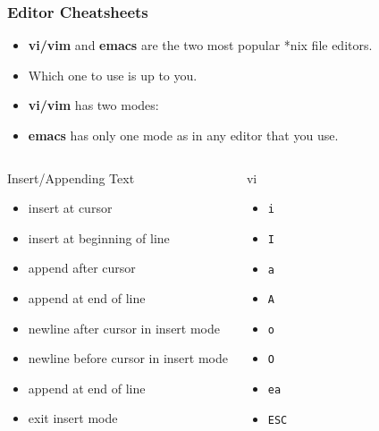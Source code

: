 \documentclass[c,compress,xcolor=svgnames]{beamer}
\newenvironment{eblock}[0]
{
\begin{beamerboxesrounded}[upper=uppercol2,lower=lowercol2,shadow=true]}
{\end{beamerboxesrounded}}
\begin{document}
\begin{frame}[allowframebreaks]
  \frametitle{\small Editor Cheatsheets}
  \begin{itemize}
    \item \textbf{\color{dkgreen}vi/vim} and \textbf{\color{dkgreen}emacs} are the two most popular *nix file editors.
    \item Which one to use is up to you.
    \item \textbf{\color{dkgreen}vi/vim} has two modes:
    \item \textbf{\color{dkgreen}emacs} has only one mode as in any editor that you use.
  \end{itemize}
  {\scriptsize
  \begin{columns}[t]
    \begin{eblock}{Insert/Appending Text}
    \begin{itemize}
      \item insert at cursor 
      \item insert at beginning of line
      \item append after cursor
      \item append at end of line
      \item newline after cursor in insert mode
      \item newline before cursor in insert mode
      \item append at end of line
      \item exit insert mode
    \end{itemize}
    \end{eblock}
    \begin{eblock}{vi}
    \begin{itemize}
      \item \texttt{i}
      \item \texttt{I}
      \item \texttt{a}
      \item \texttt{A}
      \item \texttt{o}
      \item \texttt{O}
      \item \texttt{ea}
      \item \texttt{ESC}

\end{itemize}
\end{eblock}
\end{columns}}
\end{frame}
\end{document}
